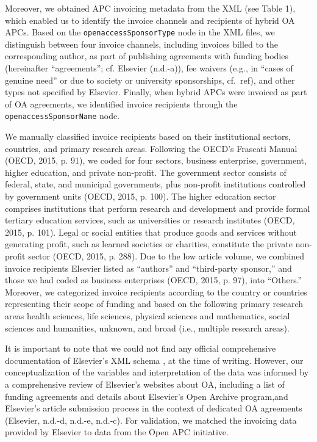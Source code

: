 \documentclass[a4paper,man,floatsintext,longtable,noextraspace,12pt]{apa6}
\begin{document}
Moreover, we obtained APC invoicing metadata from the XML (see Table 1),
which enabled us to identify the invoice channels and recipients of
hybrid OA APCs. Based on the \texttt{openaccessSponsorType} node in the
XML files, we distinguish between four invoice channels, including
invoices billed to the corresponding author, as part of publishing
agreements with funding bodies (hereinafter ``agreements''; cf. Elsevier
(n.d.-a)), fee waivers (e.g., in ``cases of genuine need'' or due to
society or university sponsorships, cf.~ref), and other types not
specified by Elsevier. Finally, when hybrid APCs were invoiced as part
of OA agreements, we identified invoice recipients through the
\texttt{openaccessSponsorName} node.

We manually classified invoice recipients based on their institutional
sectors, countries, and primary research areas. Following the OECD's
Frascati Manual (OECD, 2015, p. 91), we coded for four sectors, business
enterprise, government, higher education, and private non-profit. The
government sector consists of federal, state, and municipal governments,
plus non-profit institutions controlled by government units (OECD, 2015,
p. 100). The higher education sector comprises institutions that perform
research and development and provide formal tertiary education services,
such as universities or research institutes (OECD, 2015, p. 101). Legal
or social entities that produce goods and services without generating
profit, such as learned societies or charities, constitute the private
non-profit sector (OECD, 2015, p. 288). Due to the low article volume,
we combined invoice recipients Elsevier listed as ``authors'' and
``third-party sponsor,'' and those we had coded as business enterprises
(OECD, 2015, p. 97), into ``Others.'' Moreover, we categorized invoice
recipients according to the country or countries representing their
scope of funding and based on the following primary research areas
health sciences, life sciences, physical sciences and mathematics,
social sciences and humanities, unknown, and broad (i.e., multiple
research areas).

It is important to note that we could not find any official
comprehensive documentation of Elsevier's XML schema , at the time of
writing. However, our conceptualization of the variables and
interpretation of the data was informed by a comprehensive review of
Elsevier's websites about OA, including a list of funding agreements and
details about Elsevier's Open Archive program,and Elsevier's article
submission process in the context of dedicated OA agreements (Elsevier,
n.d.-d, n.d.-e, n.d.-c). For validation, we matched the invoicing data
provided by Elsevier to data from the Open APC initiative.
\end{document}
